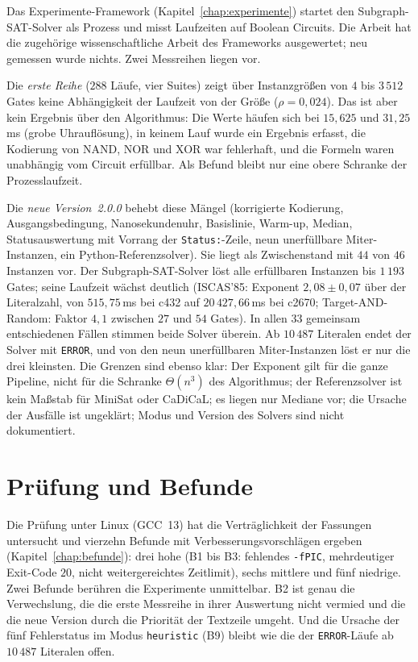 Das Experimente-Framework (Kapitel~\ref{chap:experimente}) startet den Subgraph-SAT-Solver als Prozess und misst Laufzeiten auf Boolean Circuits. Die Arbeit hat die zugehörige wissenschaftliche Arbeit des Frameworks ausgewertet; neu gemessen wurde nichts. Zwei Messreihen liegen vor.

Die \emph{erste Reihe} ($288$ Läufe, vier Suites) zeigt über Instanzgrößen von $4$ bis $3\,512$ Gates keine Abhängigkeit der Laufzeit von der Größe ($\rho=0{,}024$). Das ist aber kein Ergebnis über den Algorithmus: Die Werte häufen sich bei $15{,}625$ und $31{,}25$\,ms (grobe Uhrauflösung), in keinem Lauf wurde ein Ergebnis erfasst, die Kodierung von NAND, NOR und XOR war fehlerhaft, und die Formeln waren unabhängig vom Circuit erfüllbar. Als Befund bleibt nur eine obere Schranke der Prozesslaufzeit.

Die \emph{neue Version~2.0.0} behebt diese Mängel (korrigierte Kodierung, Ausgangsbedingung, Nanosekundenuhr, Basislinie, Warm-up, Median, Statusauswertung mit Vorrang der \texttt{Status:}-Zeile, neun unerfüllbare Miter-Instanzen, ein Python-Referenzsolver). Sie liegt als Zwischenstand mit $44$ von $46$ Instanzen vor. Der Subgraph-SAT-Solver löst alle erfüllbaren Instanzen bis $1\,193$ Gates; seine Laufzeit wächst deutlich (ISCAS'85: Exponent $2{,}08\pm0{,}07$ über der Literalzahl, von $515{,}75$\,ms bei c432 auf $20\,427{,}66$\,ms bei c2670; Target-AND-Random: Faktor $4{,}1$ zwischen $27$ und $54$ Gates). In allen $33$ gemeinsam entschiedenen Fällen stimmen beide Solver überein. Ab $10\,487$ Literalen endet der Solver mit \texttt{ERROR}, und von den neun unerfüllbaren Miter-Instanzen löst er nur die drei kleinsten. Die Grenzen sind ebenso klar: Der Exponent gilt für die ganze Pipeline, nicht für die Schranke $\Theta(n^3)$ des Algorithmus; der Referenzsolver ist kein Maßstab für MiniSat oder CaDiCaL; es liegen nur Mediane vor; die Ursache der Ausfälle ist ungeklärt; Modus und Version des Solvers sind nicht dokumentiert.

\section{Prüfung und Befunde}

Die Prüfung unter Linux (GCC~13) hat die Verträglichkeit der Fassungen untersucht und vierzehn Befunde mit Verbesserungsvorschlägen ergeben (Kapitel~\ref{chap:befunde}): drei hohe (B1 bis B3: fehlendes \texttt{-fPIC}, mehrdeutiger Exit-Code $20$, nicht weitergereichtes Zeitlimit), sechs mittlere und fünf niedrige. Zwei Befunde berühren die Experimente unmittelbar. B2 ist genau die Verwechslung, die die erste Messreihe in ihrer Auswertung nicht vermied und die die neue Version durch die Priorität der Textzeile umgeht. Und die Ursache der fünf Fehlerstatus im Modus \texttt{heuristic} (B9) bleibt wie die der \texttt{ERROR}-Läufe ab $10\,487$ Literalen offen.

